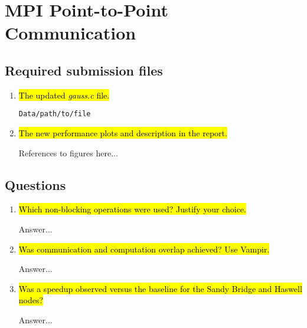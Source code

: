 \section{MPI Point-to-Point Communication}
\subsection{Required submission files}
\begin{enumerate}
	\item \hl{The updated \emph{gauss.c} file.}

		\verb!Data/path/to/file!

	\item \hl{The new performance plots and description in the report.}

		References to figures here...

\end{enumerate}

\subsection{Questions}
\begin{enumerate}
	\item \hl{Which non-blocking operations were used? Justify your choice.}

	Answer...

	\item \hl{Was communication and computation overlap achieved? Use Vampir.}

	Answer...

	\item \hl{Was a speedup observed versus the baseline for the Sandy Bridge and Haswell nodes?}

	Answer...

\end{enumerate}

